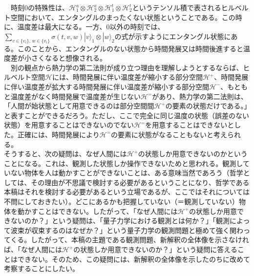 　時刻$0$の特殊性は、$\mathcal{H}_1^a \otimes \mathcal{H}_2^a \otimes \mathcal{H}_1^t \otimes \mathcal{H}_2^t$というテンソル積で表されるヒルベルト空間において、エンタングルのまったくない状態ということである。この時に、温度差は最大になる。一方、$0$以外の時刻では、$\sum_{v \in \{v_i\} ,\, w \in \{v_i\}} \sigma(t,v,w)|v\rangle_1 \otimes |w\rangle_2 $の式が示すようにエンタングル状態にある。このことから、エンタングルのない状態から時間発展又は時間後進すると温度差が小さくなると想像される。\\
　別の観点から熱力学の第二法則が成り立つ理由を理解しようとするならば、ヒルベルト空間$\mathcal{H}$には、時間発展に伴い温度差が縮小する部分空間$\mathcal{H}^+$、時間発展に伴い温度差が拡大する時間発展に伴い温度差が縮小する部分空間$\mathcal{H}^-$、もともと温度差がなく時間発展で温度差が生じない$\mathcal{H}^=$があり、熱力学の第二法則は、「人間が始状態として用意できるのは部分空間間$\mathcal{H}^+$の要素の状態だけである。」と表すことができるだろう。ただし、ここで完全に同じ温度の状態（誤差のない状態）を用意することはできないのでない$\mathcal{H}^=$を用意することはできないとした。正確には、時間発展により$\mathcal{H}^=$の要素に状態がなることもないと考えられる。\\
そうすると、次の疑問は、なぜ人間には$\mathcal{H}^+$の状態しか用意できないのかということになる。これは、観測した状態しか操作できないためと思われる。観測していない物体を人は動かすことができないことは、ある意味当然であろう（哲学としては、その理由が不思議で検討する必要があるということになり、哲学である本稿はそれを検討する必要があるという立場であるが、ここではそれについては不問にしておきたい）。どこにあるかも把握していない（＝観測していない）物体を動かすことはできない。したがって、「なぜ人間には$\mathcal{H}^+$の状態しか用意できないのか？」という疑問は、「量子力学における観測とは何か？」「観測によって波束が収束するのはなぜか？」という量子力学の観測問題と極めて強く関わってくる。したがって、本稿の主題である観測問題、新解釈の全体像を示さなければ、「なぜ人間には$\mathcal{H}^+$の状態しか用意できないのか？」という疑問に答えることはできない。そのため、この疑問には、新解釈の全体像を示したのちに改めて考察することにしたい。